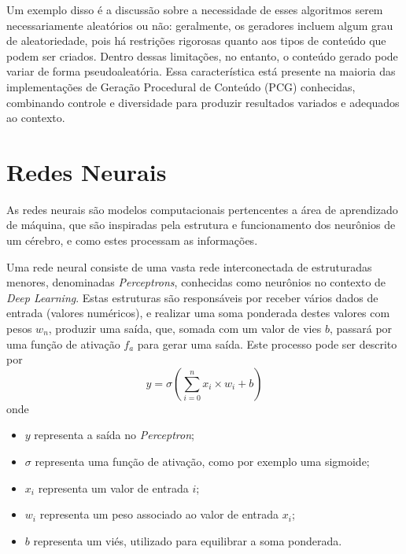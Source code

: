 Um exemplo disso é a discussão sobre a necessidade de esses algoritmos serem necessariamente aleatórios ou 
não: geralmente, os geradores incluem algum grau de aleatoriedade, pois há restrições rigorosas quanto aos 
tipos de conteúdo que podem ser criados. Dentro dessas limitações, no entanto, o conteúdo gerado pode variar 
de forma pseudoaleatória. Essa característica está presente na maioria das implementações de Geração 
Procedural de Conteúdo (PCG) conhecidas, combinando controle e diversidade para produzir resultados variados e adequados ao contexto.

\section{Redes Neurais}
As redes neurais são modelos computacionais pertencentes a área de aprendizado de máquina, que são 
inspiradas pela estrutura e funcionamento dos neurônios de um cérebro, e como estes processam as informações.

Uma rede neural consiste de uma vasta rede interconectada de estruturadas menores, denominadas \textit{Perceptrons}, conhecidas
como neurônios no contexto de \textit{Deep Learning}.
Estas estruturas são responsáveis por receber vários dados de entrada (valores numéricos), e realizar uma soma ponderada destes 
valores com pesos \(w_{n}\), produzir uma saída, que, somada com um valor de vies \(b\), passará por uma função
de ativação \(f_{a}\) para gerar uma saída. Este processo pode ser descrito por
\begin{equation}
    y = \sigma ( \sum_{i=0}^{n}x_{i} \times w_{i} + b)
\end{equation}
\noindent onde
\begin{itemize}
    \item \(y\) representa a saída no \textit{Perceptron};
    \item \(\sigma\) representa uma função de ativação, como por exemplo uma sigmoide;
    \item \(x_{i}\) representa um valor de entrada \(i\);
    \item \(w_{i}\) representa um peso associado ao valor de entrada \(x_{i}\);
    \item \(b\) representa um viés, utilizado para equilibrar a soma ponderada.
\end{itemize}

